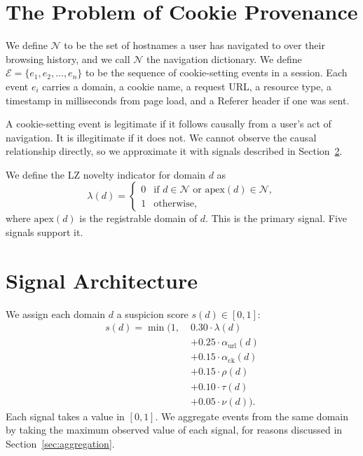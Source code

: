 \documentclass[10pt,twocolumn,letterpaper]{article}
\begin{document}
\section{The Problem of Cookie Provenance}

We define $\mathcal{N}$ to be the set of hostnames a user has navigated to
over their browsing history, and we call $\mathcal{N}$ the navigation
dictionary. We define $\mathcal{E} = \{e_1, e_2, \ldots, e_n\}$ to be the
sequence of cookie-setting events in a session. Each event $e_i$ carries a
domain, a cookie name, a request URL, a resource type, a timestamp in
milliseconds from page load, and a Referer header if one was sent.

A cookie-setting event is legitimate if it follows causally from a user's
act of navigation. It is illegitimate if it does not. We cannot observe
the causal relationship directly, so we approximate it with signals described
in Section~\ref{sec:signals}.

We define the LZ novelty indicator for domain $d$ as
\[
  \lambda(d) =
  \begin{cases}
    0 & \text{if } d \in \mathcal{N} \text{ or } \mathrm{apex}(d) \in \mathcal{N}, \\
    1 & \text{otherwise,}
  \end{cases}
\]
where $\mathrm{apex}(d)$ is the registrable domain of $d$. This is the
primary signal. Five signals support it.

\section{Signal Architecture}
\label{sec:signals}

We assign each domain $d$ a suspicion score $s(d) \in [0, 1]$:
\begin{align}
  s(d) = \min\bigl(1,\;
    &0.30 \cdot \lambda(d) \nonumber \\
    &+ 0.25 \cdot \alpha_{\mathrm{url}}(d) \nonumber \\
    &+ 0.15 \cdot \alpha_{\mathrm{ck}}(d) \nonumber \\
    &+ 0.15 \cdot \rho(d) \nonumber \\
    &+ 0.10 \cdot \tau(d) \nonumber \\
    &+ 0.05 \cdot \nu(d) \bigr).
\end{align}
Each signal takes a value in $[0, 1]$. We aggregate events from the same
domain by taking the maximum observed value of each signal, for reasons
discussed in Section~\ref{sec:aggregation}.
\end{document}
